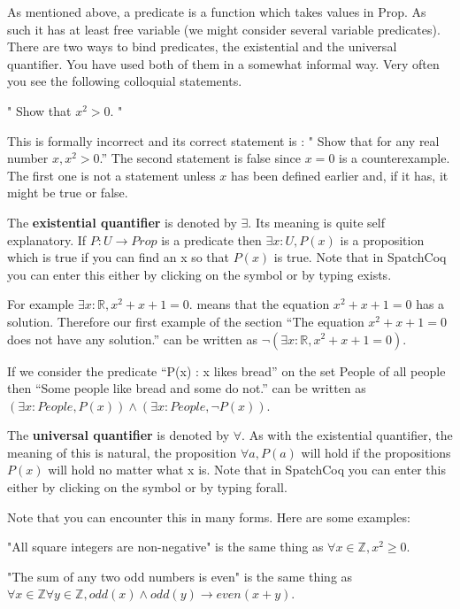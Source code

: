 As mentioned above, a predicate is a function which takes values in Prop. As such it has at least free variable (we might consider several variable predicates). There are two ways to bind predicates,  the existential and the universal quantifier. You have used both of them in a somewhat informal way.
  Very often you see the following colloquial statements.
  
 " Show that $x^2 > 0$. "
  
  This is formally incorrect and its correct statement is : " Show that for any real number $x, x^2 > 0$.''  
The second statement is false since $x=0$ is a counterexample. The first one is not a statement unless $x$ has been defined earlier and, if it has, it might be true or false.

  
  
The  {\bf existential quantifier} is denoted by $\exists$. Its meaning  is quite self explanatory. If $P:U \rightarrow Prop$ is a predicate then $\exists x:U, P(x)$ is a proposition which is true if you can find an x so that $P(x)$ is true. Note that in SpatchCoq you can enter this either by clicking on the symbol or by typing exists.


For example $\exists x:\mathbb{R}, x^{2}+x+1 =0.$ means that the equation $x^{2}+x+1=0$ has a solution. Therefore our first example of the section ``The equation $x^2+x+1=0$ does not have any solution.'' can be written as $\neg (\exists x:\mathbb{R}, x^{2}+x+1 =0).$ 

If we consider the predicate ``P(x) : x likes bread'' on the set People of all people then ``Some people like bread and some do not.'' can be written as $(\exists x:People, P(x))\land (\exists x:People, \neg P(x))$.

The {\bf universal quantifier} is denoted by $\forall$. As with the existential quantifier, the meaning of this is natural, the proposition $\forall a, P(a)$ will hold if  the propositions $P(x)$ will hold no matter what x is. 
Note that in SpatchCoq you can enter this either by clicking on the symbol or by typing forall.

Note that you can encounter this in many forms.  Here are some examples:

"All square integers are non-negative" is the same thing as $\forall x \in \mathbb{Z}, x^2\ge 0$.

"The sum of any two odd numbers is even" is the same thing as $\forall x  \in \mathbb{Z} \forall y \in  \mathbb{Z} ,  odd(x) \land odd(y) \rightarrow even(x+y)$.

